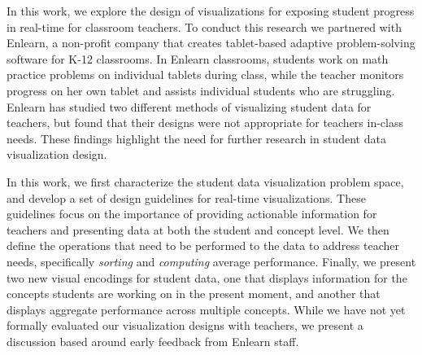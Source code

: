 \documentclass{sigchi}
\begin{document}
In this work, we explore the design of visualizations for exposing student progress in real-time for classroom teachers. To conduct this research we partnered with Enlearn, a non-profit company that creates tablet-based adaptive problem-solving software for K-12 classrooms. In Enlearn classrooms, students work on math practice problems on individual tablets during class, while the teacher monitors progress on her own tablet and assists individual students who are struggling. Enlearn has studied two different methods of visualizing student data for teachers, but found that their designs were not appropriate for teachers in-class needs. These findings highlight the need for further research in student data visualization design.

In this work, we first characterize the student data visualization problem space, and develop a set of design guidelines for real-time visualizations. These guidelines focus on the importance of providing actionable information for teachers and presenting data at both the student and concept level. We then define the operations that need to be performed to the data to address teacher needs, specifically \emph{sorting} and \emph{computing} average performance. Finally, we present two new visual encodings for student data, one that displays information for the concepts students are working on in the present moment, and another that displays aggregate performance across multiple concepts. While we have not yet formally evaluated our visualization designs with teachers, we present a discussion based around early feedback from Enlearn staff.





\end{document}
